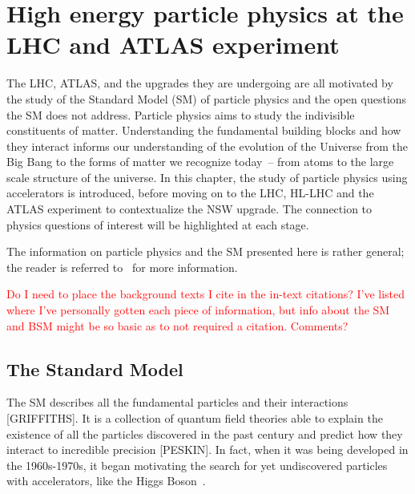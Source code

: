 
\chapter{High energy particle physics at the LHC and ATLAS experiment}
\label{chap:lhc_atlas}


The LHC, ATLAS, and the upgrades they are undergoing are all motivated by the study of the Standard Model (SM) of particle physics and the open questions the SM does not address. Particle physics aims to study the indivisible constituents of matter. Understanding the fundamental building blocks and how they interact informs our understanding of the evolution of the Universe from the Big Bang to the forms of matter we recognize today~-- from atoms to the large scale structure of the universe. In this chapter, the study of particle physics using accelerators is introduced, before moving on to the LHC, HL-LHC and the ATLAS experiment to contextualize the NSW upgrade. The connection to physics questions of interest will be highlighted at each stage. 

The information on particle physics and the SM presented here is rather general; the reader is referred to~\cite{griffiths_introduction_2011, peskin_introduction_1995, zyla_review_2020} for more information. 

\textcolor{red}{Do I need to place the background texts I cite in the in-text citations? I've listed where I've personally gotten each piece of information, but info about the SM and BSM might be so basic as to not required a citation. Comments?}

\section{The Standard Model}

The SM describes all the fundamental particles and their interactions [GRIFFITHS]. It is a collection of quantum field theories able to explain the existence of all the particles discovered in the past century and predict how they interact to incredible precision [PESKIN]. In fact, when it was being developed in the 1960s-1970s, it began motivating the search for yet undiscovered particles with accelerators, like the Higgs Boson~\cite{brianti_large_1984}. 

